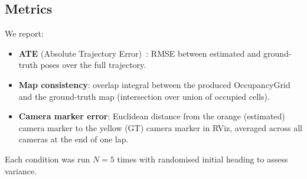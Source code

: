\subsection{Metrics}

We report:
\begin{itemize}
    \item \textbf{ATE} (Absolute Trajectory Error)~\cite{sturm2012benchmark}:
          RMSE between estimated and ground-truth poses over the full trajectory.
    \item \textbf{Map consistency}: overlap integral between the produced
          OccupancyGrid and the ground-truth map (intersection over union of
          occupied cells).
    \item \textbf{Camera marker error}: Euclidean distance from the orange
          (estimated) camera marker to the yellow (GT) camera marker in RViz,
          averaged across all cameras at the end of one lap.
\end{itemize}

Each condition was run $N=5$ times with randomised initial heading to assess
variance.
